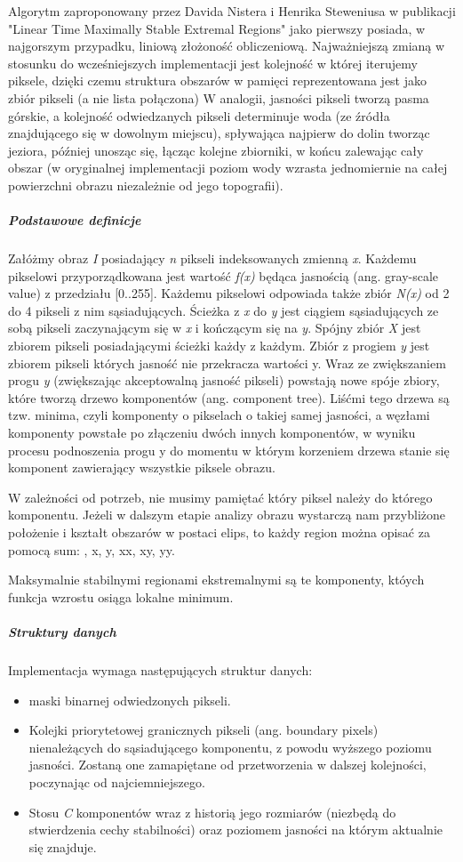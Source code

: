 Algorytm zaproponowany przez Davida Nistera i Henrika Steweniusa w publikacji
"Linear Time Maximally Stable Extremal Regions" jako pierwszy posiada, w
najgorszym przypadku, liniową złożoność obliczeniową. Najważniejszą zmianą w
stosunku do wcześniejszych implementacji jest kolejność w której iterujemy
piksele, dzięki czemu struktura obszarów w pamięci reprezentowana jest jako
zbiór pikseli (a nie lista połączona) W analogii, jasności pikseli tworzą pasma
górskie, a kolejność odwiedzanych pikseli determinuje woda (ze źródła
znajdującego się w dowolnym miejscu), spływająca najpierw do dolin tworząc
jeziora, później unosząc się, łącząc kolejne zbiorniki, w końcu zalewając cały
obszar (w oryginalnej implementacji poziom wody wzrasta jednomiernie na całej
powierzchni obrazu niezależnie od jego topografii).

\subparagraph{Podstawowe definicje}

Załóżmy obraz \textit{I} posiadający \textit{n} pikseli indeksowanych zmienną
\textit{x}. Każdemu pikselowi przyporządkowana jest wartość \textit{f(x)}
będąca jasnością (ang. gray-scale value) z przedziału [0..255]. Każdemu
pikselowi odpowiada także zbiór \textit{N(x)} od 2 do 4 pikseli z nim
sąsiadujących. Ścieżka z \textit{x} do \textit{y} jest ciągiem sąsiadujących ze
sobą pikseli zaczynającym się w \textit{x} i kończącym się na \textit{y}.
Spójny zbiór \textit{X} jest zbiorem pikseli posiadającymi ścieżki każdy z
każdym. Zbiór z progiem \textit{y} jest zbiorem pikseli których jasność nie
przekracza wartości y. Wraz ze zwiększaniem progu \textit{y} (zwiększając
akceptowalną jasność pikseli) powstają nowe spóje zbiory, które tworzą drzewo
komponentów (ang. component tree). Liśćmi tego drzewa są tzw. minima, czyli
komponenty o pikselach o takiej samej jasności, a węzłami komponenty powstałe
po złączeniu dwóch innych komponentów, w wyniku procesu podnoszenia progu y do
momentu w którym korzeniem drzewa stanie się komponent zawierający wszystkie
piksele obrazu.

W zależności od potrzeb, nie musimy pamiętać który piksel należy do którego
komponentu. Jeżeli w dalszym etapie analizy obrazu wystarczą nam przybliżone
położenie i kształt obszarów w postaci elips, to każdy region można opisać za
pomocą sum: , x, y, xx, xy, yy.

Maksymalnie stabilnymi regionami ekstremalnymi są te komponenty, któych funkcja
wzrostu osiąga lokalne minimum.

\subparagraph{Struktury danych}

Implementacja wymaga następujących struktur danych: \begin{itemize} \item maski
binarnej odwiedzonych pikseli. \item Kolejki priorytetowej granicznych pikseli
(ang. boundary pixels) nienależących do sąsiadującego komponentu, z powodu
wyższego poziomu jasności. Zostaną one zamapiętane od przetworzenia w dalszej
kolejności, poczynając od najciemniejszego. \item Stosu \textit{C} komponentów
wraz z historią jego rozmiarów (niezbędą do stwierdzenia cechy stabilności)
oraz poziomem jasności na którym aktualnie się znajduje.  \end{itemize}

